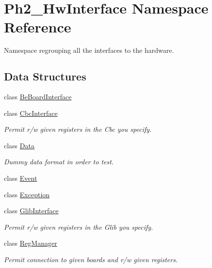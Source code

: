 \hypertarget{namespace_ph2___hw_interface}{\section{Ph2\-\_\-\-Hw\-Interface Namespace Reference}
\label{namespace_ph2___hw_interface}
}


Namespace regrouping all the interfaces to the hardware.  


\subsection*{Data Structures}
\begin{DoxyCompactItemize}
\item 
class \hyperlink{class_ph2___hw_interface_1_1_be_board_interface}{Be\-Board\-Interface}
\item 
class \hyperlink{class_ph2___hw_interface_1_1_cbc_interface}{Cbc\-Interface}
\begin{DoxyCompactList}\small\item\em Permit r/w given registers in the Cbc you specify. \end{DoxyCompactList}\item 
class \hyperlink{class_ph2___hw_interface_1_1_data}{Data}
\begin{DoxyCompactList}\small\item\em Dummy data format in order to test. \end{DoxyCompactList}\item 
class \hyperlink{class_ph2___hw_interface_1_1_event}{Event}
\item 
class \hyperlink{class_ph2___hw_interface_1_1_exception}{Exception}
\item 
class \hyperlink{class_ph2___hw_interface_1_1_glib_interface}{Glib\-Interface}
\begin{DoxyCompactList}\small\item\em Permit r/w given registers in the Glib you specify. \end{DoxyCompactList}\item 
class \hyperlink{class_ph2___hw_interface_1_1_reg_manager}{Reg\-Manager}
\begin{DoxyCompactList}\small\item\em Permit connection to given boards and r/w given registers. \end{DoxyCompactList}\end{DoxyCompactItemize}
